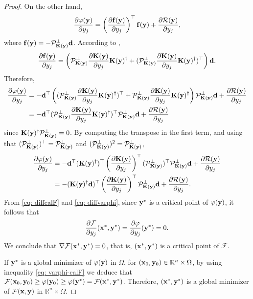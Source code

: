 \documentclass[onefignum,onetabnum]{siamart171218}
\newcommand{\bK}{{\bf K}}
\newcommand{\bd}{{\bf d}}
\newcommand{\bff}{{\bf f}}
\newcommand{\bx}{{\bf x}}
\newcommand{\by}{{\bf y}}
\newcommand{\calF}{\mathcal{F}}
\newcommand{\calP}{\mathcal{P}}
\newcommand{\calR}{\mathcal{R}}
\newcommand{\bbR}{\mathbb{R}}
\begin{document}
\begin{proof}
On the other hand,
\[\dfrac{\partial \varphi (\by) }{\partial y_j} = \left( \dfrac{\partial \bff(\by)}{\partial y_j}  \right)^\top \bff(\by) + \dfrac{\partial \calR (\by)}{\partial y_j}, \]
where $\bff(\by) = -\calP_{\bK(\by)}^\perp \bd$.
According to \cite{Espanol_2023}, 
\begin{equation}\label{eq: Jac_columns}
    \dfrac{\partial \bff(\by)}{\partial y_j} =  \left(\calP_{\bK(\by)}^\perp \dfrac{\partial \bK(\by)}{\partial y_j} \bK(\by)^\dagger + (\calP_{\bK(\by)}^\perp \dfrac{\partial \bK(\by)}{\partial y_j} \bK(\by)^\dagger)^\top \right) \bd.\end{equation}
Therefore,
\begin{align*}
\dfrac{\partial \varphi (\by) }{\partial y_j} & = - \bd^\top \left((\calP_{\bK(\by)}^\perp \dfrac{\partial \bK(\by)}{\partial y_j} \bK(\by)^\dagger)^\top+\calP_{\bK(\by)}^\perp \dfrac{\partial \bK(\by)}{\partial y_j} \bK(\by)^\dagger  \right) \calP_{\bK(\by)}^\perp \bd +\dfrac{\partial \calR (\by)}{\partial y_j} \\
&= - \bd^\top (\calP_{\bK(\by)}^\perp \dfrac{\partial \bK(\by)}{\partial y_j} \bK(\by)^\dagger)^\top \calP_{\bK(\by)}^\perp \bd +\dfrac{\partial \calR (\by)}{\partial y_j} 
\end{align*}
since $\bK(\by)^\dagger  \calP_{\bK(\by)}^\perp =0$. By computing the transpose in the first term, and using that $(\calP_{\bK(\by)}^\perp)^\top = \calP_{\bK(\by)}^\perp$ and $(\calP_{\bK(\by)}^\perp)^2 =\calP_{\bK(\by)}^\perp$, 
\begin{align}\label{eq: diffvarphi}
\dfrac{\partial \varphi (\by) }{\partial y_j} &= - \bd^\top (\bK(\by)^\dagger)^\top  \left( \dfrac{\partial \bK(\by)}{\partial y_j} \right)^\top(\calP_{\bK(\by)}^\perp)^\top \calP_{\bK(\by)}^\perp \bd +\dfrac{\partial \calR (\by)}{\partial y_j}   \nonumber \\ 
&=  - (\bK(\by)^\dagger \bd)^\top \left( \dfrac{\partial \bK(\by)}{\partial y_j} \right)^\top \calP_{\bK(\by)}^\perp \bd +\dfrac{\partial \calR (\by)}{\partial y_j}  .
\end{align}
From \eqref{eq: diffcalF} and \eqref{eq: diffvarphi}, since $\by^*$ is a critical point of $\varphi(\by)$, it follows that
\[\dfrac{\partial \calF}{\partial y_j} (\bx^*, \by^*)=\dfrac{\partial \varphi} {\partial y_j}  (\by^*) =0. \]
We conclude that $\nabla \calF(\bx^*, \by^*)=0$, that is, $(\bx^*, \by^*)$ is a critical point of $\calF$.

If $\by^*$ is a global minimizer of $\varphi(\by)$ in $\Omega$, for $(\bx_0, \by_0)\in \bbR^n\times \Omega$, by using inequality \eqref{eq: varphi-calF} we deduce that $\calF(\bx_0, \by_0)\ge \varphi(\by_0) \ge\varphi(\by^*) = \calF(\bx^*, \by^*)$. Therefore, $(\bx^*, \by^*)$ is a global minimizer of $\calF(\bx, \by)$ in $\bbR^n\times \Omega$.
\end{proof}
\end{document}
